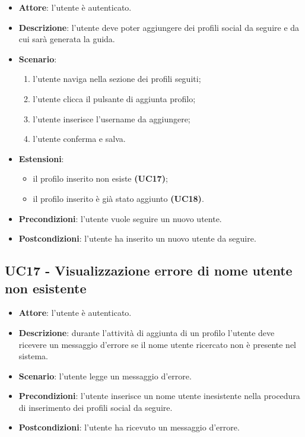 \begin{itemize}
    \item \textbf{Attore}: l'utente è autenticato.
    \item \textbf{Descrizione}: l'utente deve poter aggiungere dei profili social da seguire e da cui sarà generata la guida.
    \item \textbf{Scenario}:
    \begin{enumerate}
        \item l'utente naviga nella sezione dei profili seguiti;
        \item l'utente clicca il pulsante di aggiunta profilo;
        \item l'utente inserisce l'username da aggiungere;
        \item l'utente conferma e salva.
    \end{enumerate}
    \item \textbf{Estensioni}:
    \begin{itemize}
    	\item il profilo inserito non esiste \textbf{(UC17)};
    	\item il profilo inserito è già stato aggiunto \textbf{(UC18)}.
    \end{itemize} 
    \item \textbf{Precondizioni}: l'utente vuole seguire un nuovo utente.
    \item \textbf{Postcondizioni}: l'utente ha inserito un nuovo utente da seguire.
\end{itemize}

\subsection{UC17 - Visualizzazione errore di nome utente non esistente}
\begin{itemize}
    \item \textbf{Attore}: l'utente è autenticato.
    \item \textbf{Descrizione}: durante l'attività di aggiunta di un profilo l'utente deve ricevere un messaggio d'errore se il nome utente ricercato non è presente nel sistema.
    \item \textbf{Scenario}: l'utente legge un messaggio d'errore. 
    \item \textbf{Precondizioni}: l'utente inserisce un nome utente inesistente nella procedura di inserimento dei profili social da seguire.
    \item \textbf{Postcondizioni}: l'utente ha ricevuto un messaggio d'errore.
\end{itemize}

